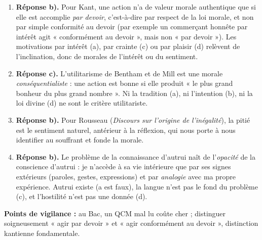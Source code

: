\documentclass[11pt]{article}
\newcommand{\cle}[1]{{\popxbold\color{popdark}#1}}
\begin{document}
\begin{corrige}
\begin{enumerate}
\item \textbf{Réponse b).} Pour Kant, une action n'a de valeur morale authentique que si elle est accomplie \emph{par devoir}, c'est-à-dire par respect de la loi morale, et non par simple conformité au devoir (par exemple un commerçant honnête par intérêt agit « conformément au devoir », mais non « par devoir »). Les motivations par intérêt (a), par crainte (c) ou par plaisir (d) relèvent de l'inclination, donc de morales de l'intérêt ou du sentiment.
\item \textbf{Réponse c).} L'utilitarisme de Bentham et de Mill est une morale \emph{conséquentialiste} : une action est bonne si elle produit « le plus grand bonheur du plus grand nombre ». Ni la tradition (a), ni l'intention (b), ni la loi divine (d) ne sont le critère utilitariste.
\item \textbf{Réponse b).} Pour Rousseau (\emph{Discours sur l'origine de l'inégalité}), la \cle{pitié} est le sentiment naturel, antérieur à la réflexion, qui nous porte à nous identifier au souffrant et fonde la morale.
\item \textbf{Réponse b).} Le problème de la connaissance d'autrui naît de l'\emph{opacité} de la conscience d'autrui : je n'accède à sa vie intérieure que par ses signes extérieurs (paroles, gestes, expressions) et par \emph{analogie} avec ma propre expérience. Autrui existe (a est faux), la langue n'est pas le fond du problème (c), et l'hostilité n'est pas une donnée (d).
\end{enumerate}
\textbf{Points de vigilance :} au Bac, un QCM mal lu coûte cher ; distinguer soigneusement « agir par devoir » et « agir conformément au devoir », distinction kantienne fondamentale.
\end{corrige}
\end{document}
